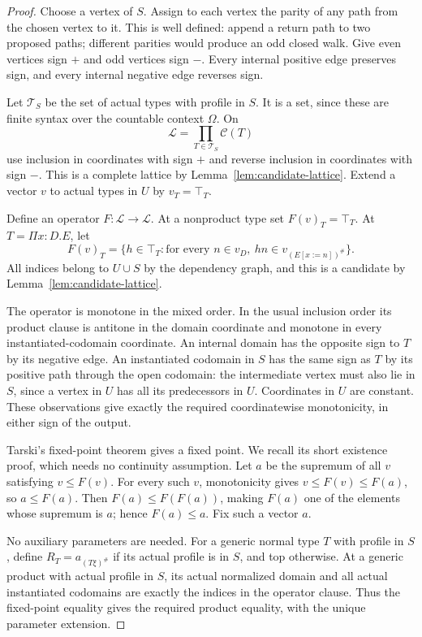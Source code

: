 \begin{proof}
Choose a vertex of $S$. Assign to each vertex the parity of any path
from the chosen vertex to it. This is well defined: append a return
path to two proposed paths; different parities would produce an odd
closed walk. Give even vertices sign $+$ and odd vertices sign $-$.
Every internal positive edge preserves sign, and every internal
negative edge reverses sign.

Let $\mathcal T_S$ be the set of actual types with profile in $S$.
It is a set, since these are finite syntax over the countable context
$\Omega$. On
\[
                      \mathcal L=
                  \prod_{T\in\mathcal T_S}\mathcal C(T)
\]
use inclusion in coordinates with sign $+$ and reverse inclusion in
coordinates with sign $-$. This is a complete lattice by
Lemma~\ref{lem:candidate-lattice}. Extend a vector $v$ to actual
types in $U$ by $v_T=\top_T$.

Define an operator $F:\mathcal L\to\mathcal L$. At a nonproduct
type set $F(v)_T=\top_T$. At $T=\Pi x:D.E$, let
\[
 F(v)_T=\{h\in\top_T:\text{for every }n\in v_D,
                                      \ h n\in v_{(E[x:=n])^\#}\}.
\]
All indices belong to $U\cup S$ by the dependency graph, and this
is a candidate by Lemma~\ref{lem:candidate-lattice}.

The operator is monotone in the mixed order. In the usual inclusion
order its product clause is antitone in the domain coordinate and
monotone in every instantiated-codomain coordinate. An internal domain
has the opposite sign to $T$ by its negative edge. An instantiated
codomain in $S$ has the same sign as $T$ by its positive path through
the open codomain: the intermediate vertex must also lie in $S$,
since a vertex in $U$ has all its predecessors in $U$. Coordinates
in $U$ are constant. These observations
give exactly the required coordinatewise monotonicity, in either sign
of the output.

Tarski's fixed-point theorem \cite[Theorem~1]{Tarski1955} gives a fixed
point. We recall its short existence proof, which needs no continuity
assumption. Let $a$ be the supremum of all
$v$ satisfying $v\le F(v)$. For every such $v$, monotonicity gives
$v\le F(v)\le F(a)$, so $a\le F(a)$. Then
$F(a)\le F(F(a))$, making $F(a)$ one of the elements whose supremum
is $a$; hence $F(a)\le a$. Fix such a vector $a$.

No auxiliary parameters are needed. For a generic normal type $T$
with profile in $S$, define $R_T=a_{(T\xi)^\#}$ if its actual
profile is in $S$, and top otherwise. At a generic product with
actual profile in $S$, its actual normalized domain and all actual
instantiated codomains are exactly the indices in the operator clause.
Thus the fixed-point equality gives the required product equality,
with the unique parameter extension.


\end{proof}
